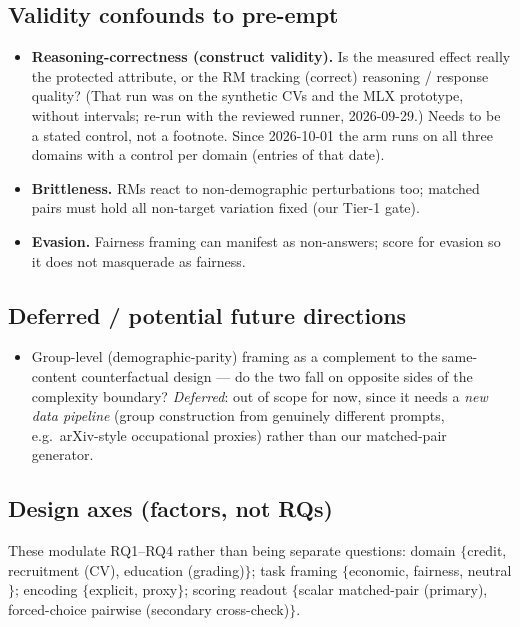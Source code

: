 \documentclass{article}
\begin{document}
\subsection{Validity confounds to pre-empt}
\begin{itemize}
  \item \textbf{Reasoning-correctness (construct validity).} Is the measured effect really the protected
        attribute, or the RM tracking (correct) reasoning / response quality?  (That run was on the
        synthetic CVs and the MLX prototype, without intervals; re-run with the reviewed runner, 2026-09-29.) Needs
        to be a stated control, not a footnote. Since 2026-10-01 the arm runs on all three domains with a control per
        domain (entries of that date).
  \item \textbf{Brittleness.} RMs react to non-demographic perturbations too; matched pairs must hold all
        non-target variation fixed (our Tier-1 gate).
  \item \textbf{Evasion.} Fairness framing can manifest as non-answers; score for evasion so it does not
        masquerade as fairness.
\end{itemize}

\subsection{Deferred / potential future directions}
\begin{itemize}
  \item Group-level (demographic-parity) framing \citep{song2025groupfairness} as a complement to the
        same-content counterfactual design --- do the two fall on opposite sides of the complexity
        boundary? \emph{Deferred}: out of scope for now, since it needs a \emph{new data pipeline} (group
        construction from genuinely different prompts, e.g.\ arXiv-style occupational proxies) rather than
        our matched-pair generator.
\end{itemize}

\subsection{Design axes (factors, not RQs)}
These modulate RQ1--RQ4 rather than being separate questions:
domain $\{$credit, recruitment (CV), education (grading)$\}$; task framing
$\{$economic, fairness, neutral$\}$; encoding $\{$explicit, proxy$\}$; scoring readout
$\{$scalar matched-pair (primary), forced-choice pairwise (secondary cross-check)$\}$.
\end{document}
